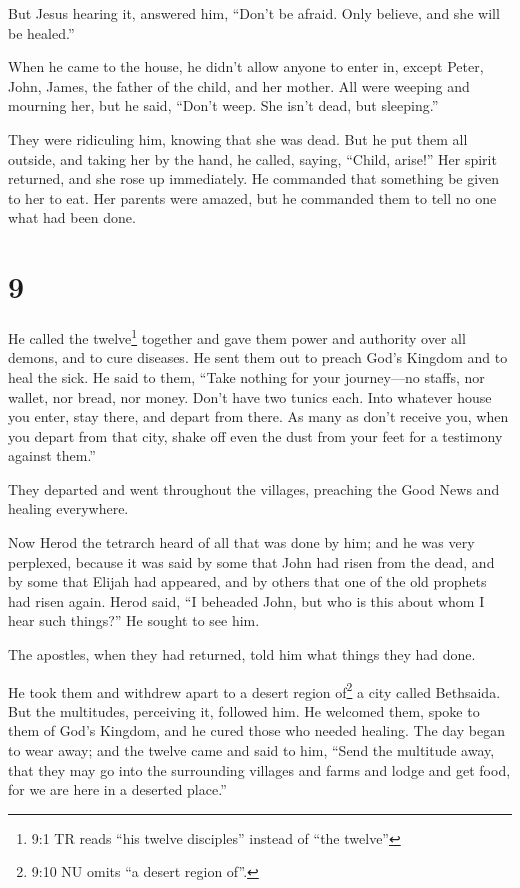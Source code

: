  But Jesus hearing it, answered him, ``Don't be afraid.
Only believe, and she will be healed.''

 When he came to the house, he didn't allow anyone to enter
in, except Peter, John, James, the father of the child, and her mother.
 All were weeping and mourning her, but he said, ``Don't
weep. She isn't dead, but sleeping.''

 They were ridiculing him, knowing that she was dead.
 But he put them all outside, and taking her by the hand,
he called, saying, ``Child, arise!''  Her spirit returned,
and she rose up immediately. He commanded that something be given to her
to eat.  Her parents were amazed, but he commanded them to
tell no one what had been done.

\hypertarget{section-8}{%
\section{9}\label{section-8}}

 He called the twelve\footnote{9:1 TR reads ``his twelve
  disciples'' instead of ``the twelve''} together and gave them power
and authority over all demons, and to cure diseases.  He
sent them out to preach God's Kingdom and to heal the sick. 
He said to them, ``Take nothing for your journey---no staffs, nor
wallet, nor bread, nor money. Don't have two tunics each. 
Into whatever house you enter, stay there, and depart from there.
 As many as don't receive you, when you depart from that
city, shake off even the dust from your feet for a testimony against
them.''

 They departed and went throughout the villages, preaching
the Good News and healing everywhere.

 Now Herod the tetrarch heard of all that was done by him;
and he was very perplexed, because it was said by some that John had
risen from the dead,  and by some that Elijah had appeared,
and by others that one of the old prophets had risen again. 
Herod said, ``I beheaded John, but who is this about whom I hear such
things?'' He sought to see him.

 The apostles, when they had returned, told him what things
they had done.

He took them and withdrew apart to a desert region of\footnote{9:10 NU
  omits ``a desert region of''.} a city called Bethsaida. 
But the multitudes, perceiving it, followed him. He welcomed them, spoke
to them of God's Kingdom, and he cured those who needed healing.
 The day began to wear away; and the twelve came and said
to him, ``Send the multitude away, that they may go into the surrounding
villages and farms and lodge and get food, for we are here in a deserted
place.''

